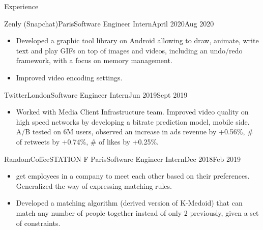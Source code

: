 \documentclass{resume}
\begin{document}
	\begin{rSection}{Experience}
        \begin{job}{Zenly (Snapchat)}{Paris}{Software Engineer Intern}{April 2020}{Aug 2020}{
            \begin{itemize}
                \item Developed a graphic tool library on Android allowing to draw, animate, write text and play GIFs on top of images and videos, including an undo/redo framework, with a focus on memory management.
                \item Improved video encoding settings.
            \end{itemize}
        }
        \end{job}

		\begin{job}{Twitter}{London}{Software Engineer Intern}{Jun 2019}{Sept 2019}{
            \begin{itemize}
                \item Worked with Media Client Infrastructure team. Improved video quality on high speed networks by developing a bitrate prediction model, mobile side. A/B tested on 6M users, observed an increase in ads revenue by +0.56\%, \# of retweets by +0.74\%, \# of likes by +0.25\%.
            \end{itemize}
		}
		\end{job}

		\begin{job}{RandomCoffee}{STATION F Paris}{Software Engineer Intern}{Dec 2018}{Feb 2019}{
            \begin{itemize}
                \item {} get employees in a company to meet each other based on their preferences. Generalized the way of expressing matching rules.
                \item Developed a matching algorithm (derived version of K-Medoid) that can match any number of people together instead of only 2 previously, given a set of constraints.
            \end{itemize}
		}
		\end{job}


\end{rSection}
\end{document}
